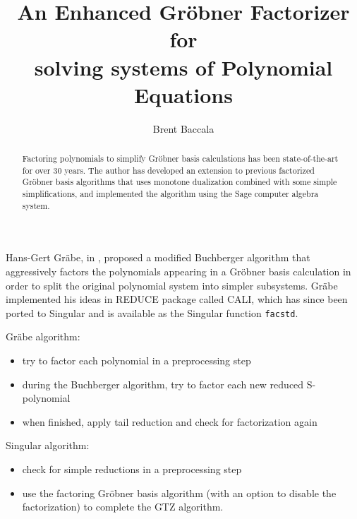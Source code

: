 \documentclass{article}
\title{An Enhanced Gr\"obner Factorizer for\\ solving systems of Polynomial Equations}
\author{Brent Baccala}
\begin{document}
\parindent 0pt

\maketitle

\begin{abstract}
Factoring polynomials to simplify Gr\"obner basis calculations has
been state-of-the-art for over 30 years.
The author has developed an extension to previous factorized Gr\"obner basis algorithms
that uses monotone dualization combined with some simple simplifications, and
implemented the algorithm using the Sage computer algebra system.
\end{abstract}


\parskip 12pt


Hans-Gert Gr\"abe, in \cite{Grabe94}, proposed a modified Buchberger algorithm
that aggressively factors the polynomials appearing in a Gr\"obner basis
calculation in order to split the original polynomial system into simpler subsystems.
Gr\"abe implemented his ideas in REDUCE package called CALI, which has since been ported
to Singular and is available as the Singular function {\tt facstd}.

Gr\"abe algorithm:

\begin{itemize}
\item try to factor each polynomial in a preprocessing step
\item during the Buchberger algorithm, try to factor each new reduced S-polynomial
\item when finished, apply tail reduction and check for factorization again
\end{itemize}

Singular algorithm:

\begin{itemize}
\item check for simple reductions in a preprocessing step
\item use the factoring Gr\"obner basis algorithm (with an option to disable the factorization) to complete the GTZ algorithm.
\end{itemize}
\end{document}
